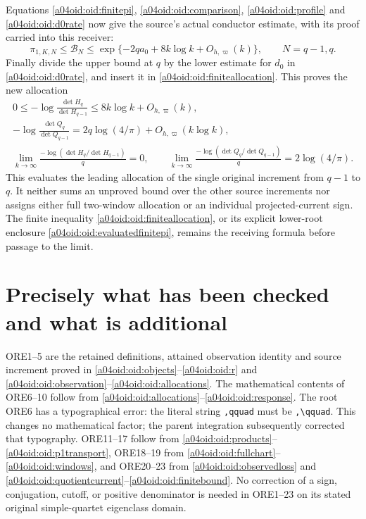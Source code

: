 \documentclass[11pt,a4paper]{article}
\begin{document}
Equations \eqref{a04oid:oid:finitepi}, \eqref{a04oid:oid:comparison},
\eqref{a04oid:oid:profile} and \eqref{a04oid:oid:d0rate} now give the source's
actual conductor estimate, with its proof carried into this receiver:
\begin{equation}\label{a04oid:oid:pirate}
 \pi_{1,K,N}\le\mathcal B_N
 \le\exp\{-2qa_0+8k\log k+O_{h,\varpi}(k)\},
 \qquad N=q-1,q.
\end{equation}
Finally divide the upper bound at $q$ by the lower estimate for
$d_0$ in \eqref{a04oid:oid:d0rate}, and insert it in
\eqref{a04oid:oid:finiteallocation}. This proves the new allocation
\begin{equation}\label{a04oid:oid:firstallocation}
 \boxed{\begin{gathered}
 0\le-\log\frac{\det H_q}{\det H_{q-1}}
 \le8k\log k+O_{h,\varpi}(k),\\
 -\log\frac{\det Q_q}{\det Q_{q-1}}
 =2q\log(4/\pi)+O_{h,\varpi}(k\log k),\\
 \lim_{k\to\infty}\frac{-\log(\det H_q/\det H_{q-1})}{q}=0,
 \qquad
 \lim_{k\to\infty}\frac{-\log(\det Q_q/\det Q_{q-1})}{q}
 =2\log(4/\pi).
 \end{gathered}}
\end{equation}
This evaluates the leading allocation of the single original
increment from $q-1$ to $q$. It neither sums an unproved bound over
the other source increments nor assigns either full two-window
allocation or an individual projected-current sign. The finite
inequality \eqref{a04oid:oid:finiteallocation}, or its explicit lower-root
enclosure \eqref{a04oid:oid:evaluatedfinitepi}, remains the receiving formula
before passage to the limit.

\section{Precisely what has been checked and what is additional}

ORE1--5 are the retained definitions, attained observation identity
and source increment proved in \eqref{a04oid:oid:objects}--\eqref{a04oid:oid:r}
and \eqref{a04oid:oid:observation}--\eqref{a04oid:oid:allocations}.
The mathematical contents of ORE6--10 follow from
\eqref{a04oid:oid:allocations}--\eqref{a04oid:oid:response}. The root ORE6 has
a typographical error: the literal string \texttt{,qquad} must be
\texttt{,\textbackslash qquad}. This changes no mathematical factor;
the parent integration subsequently corrected that typography.
ORE11--17 follow from \eqref{a04oid:oid:products}--\eqref{a04oid:oid:p1transport},
ORE18--19 from \eqref{a04oid:oid:fullchart}--\eqref{a04oid:oid:windows}, and
ORE20--23 from \eqref{a04oid:oid:observedloss} and
\eqref{a04oid:oid:quotientcurrent}--\eqref{a04oid:oid:finitebound}. No correction
of a sign, conjugation, cutoff, or positive denominator is needed in
ORE1--23 on its stated original simple-quartet eigenclass domain.
\end{document}
